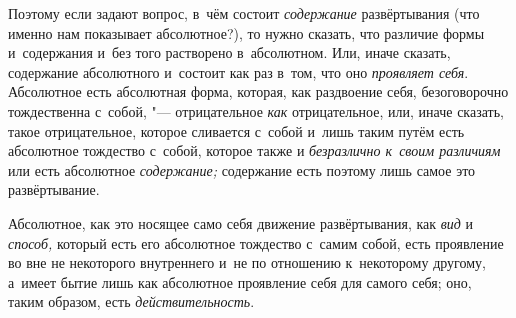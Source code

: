 Поэтому если задают вопрос, в~чём состоит
{\em содержание} развёртывания (что именно нам
показывает абсолютное?), то нужно сказать, что различие формы и~содержания
и~без того растворено в~абсолютном. Или, иначе сказать, содержание
абсолютного и~состоит как раз в~том, что оно
{\em проявляет себя}. Абсолютное есть абсолютная форма,
которая, как раздвоение себя, безоговорочно тождественна с~собой, "---
отрицательное {\em как} отрицательное, или, иначе
сказать, такое отрицательное, которое сливается с~собой и~лишь таким путём
есть абсолютное тождество с~собой, которое также и
{\em безразлично к~своим различиям} или есть абсолютное
{\em содержание;} содержание есть поэтому лишь самое это развёртывание.

Абсолютное, как это носящее само себя движение развёртывания, как
{\em вид} и {\em способ,} который
есть его абсолютное тождество с~самим собой, есть проявление во вне не
некоторого внутреннего и~не по отношению к~некоторому другому, а~имеет
бытие лишь как абсолютное проявление себя для самого себя; оно, таким
образом, есть {\em действительность}.


